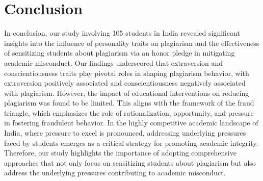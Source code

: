 \section{Conclusion}
\label{sec:conclusion}

In conclusion, our study involving 105 students in India revealed significant insights into the influence of personality traits on plagiarism and the effectiveness of sensitizing students about plagiarism via an honor pledge in mitigating academic misconduct. Our findings underscored that extraversion and conscientiousness traits play pivotal roles in shaping plagiarism behavior, with extraversion positively associated and conscientiousness negatively associated with plagiarism. However, the impact of educational interventions on reducing plagiarism was found to be limited. This aligns with the framework of the fraud triangle, which emphasizes the role of rationalization, opportunity, and pressure in fostering fraudulent behavior. In the highly competitive academic landscape of India, where pressure to excel is pronounced, addressing underlying pressures faced by students emerges as a critical strategy for promoting academic integrity. Therefore, our study highlights the importance of adopting comprehensive approaches that not only focus on sensitizing students about plagiarism but also address the underlying pressures contributing to academic misconduct.